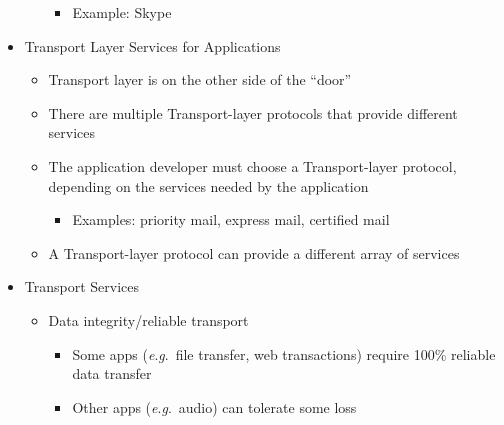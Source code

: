 \begin{itemize}
\begin{itemize}
        \begin{itemize}

          \item Example: Skype

        \end{itemize}

    \end{itemize}

  \item Transport Layer Services for Applications

    \begin{itemize}

      \item Transport layer is on the other side of the ``door''

      \item There are multiple Transport-layer protocols that provide different services

      \item The application developer must choose a Transport-layer protocol, depending on the services needed by the application

        \begin{itemize}

          \item Examples: priority mail, express mail, certified mail

        \end{itemize}

      \item A Transport-layer protocol can provide a different array of services

    \end{itemize}

  \item Transport Services

    \begin{itemize}

      \item Data integrity/reliable transport

        \begin{itemize}

          \item Some apps (\textit{e}.\textit{g}.\ file transfer, web transactions) require 100\% reliable data transfer

          \item Other apps (\textit{e}.\textit{g}.\ audio) can tolerate some loss


\end{itemize}
\end{itemize}
\end{itemize}
